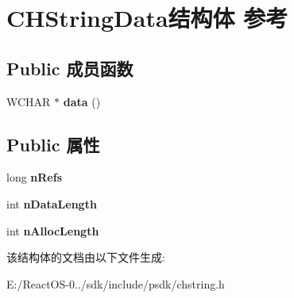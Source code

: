 \hypertarget{struct_c_h_string_data}{}\section{C\+H\+String\+Data结构体 参考}
\label{struct_c_h_string_data}
\subsection*{Public 成员函数}
\begin{DoxyCompactItemize}
\item 
\mbox{\label{struct_c_h_string_data_aa4c197a594dd084383682f8df5e06d21}} 
W\+C\+H\+AR $\ast$ {\bfseries data} ()
\end{DoxyCompactItemize}
\subsection*{Public 属性}
\begin{DoxyCompactItemize}
\item 
\mbox{\label{struct_c_h_string_data_a272bf8d2ccd25f2b99981fbd16872841}} 
long {\bfseries n\+Refs}
\item 
\mbox{\label{struct_c_h_string_data_ae26e11b915ba10f9edf14f6abf7a0b69}} 
int {\bfseries n\+Data\+Length}
\item 
\mbox{\label{struct_c_h_string_data_aefbf9b366b6b4a4b8e1f936bfee620f7}} 
int {\bfseries n\+Alloc\+Length}
\end{DoxyCompactItemize}


该结构体的文档由以下文件生成\+:\begin{DoxyCompactItemize}
\item 
E\+:/\+React\+O\+S-\/0../sdk/include/psdk/chstring.\+h\end{DoxyCompactItemize}
